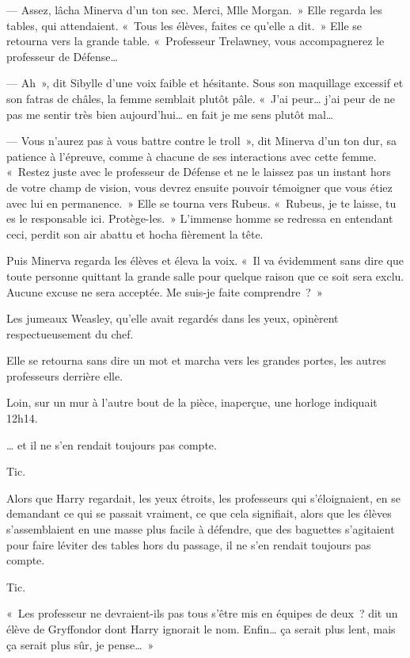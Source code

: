 --- Assez, lâcha Minerva d'un ton sec.
Merci, Mlle Morgan.~»
Elle regarda les tables, qui attendaient.
«~Tous les élèves, faites ce qu'elle a dit.~»
Elle se retourna vers la grande table.
«~Professeur Trelawney, vous accompagnerez le professeur de Défense…

--- Ah~», dit Sibylle d'une voix faible et hésitante.
Sous son maquillage excessif et son fatras de châles, la femme semblait plutôt pâle.
«~J'ai peur… j'ai peur de ne pas me sentir très bien aujourd'hui… en fait je me sens plutôt mal…

--- Vous n'aurez pas à vous battre contre le troll~», dit Minerva d'un ton dur, sa patience à l'épreuve, comme à chacune de ses interactions avec cette femme.
«~Restez juste avec le professeur de Défense et ne le laissez pas un instant hors de votre champ de vision, vous devrez ensuite pouvoir témoigner que vous étiez avec lui en permanence.~»
Elle se tourna vers Rubeus.
«~Rubeus, je te laisse, tu es le responsable ici.
Protège-les.~»
L'immense homme se redressa en entendant ceci, perdit son air abattu et hocha fièrement la tête.

Puis Minerva regarda les élèves et éleva la voix.
«~Il va évidemment sans dire que toute personne quittant la grande salle pour quelque raison que ce soit sera exclu.
Aucune excuse ne sera acceptée.
Me suis-je faite comprendre~?~»

Les jumeaux Weasley, qu'elle avait regardés dans les yeux, opinèrent respectueusement du chef.

Elle se retourna sans dire un mot et marcha vers les grandes portes, les autres professeurs derrière elle.

Loin, sur un mur à l'autre bout de la pièce, inaperçue, une horloge indiquait 12h14.

… et il ne s'en rendait toujours pas compte.

Tic.

Alors que Harry regardait, les yeux étroits, les professeurs qui s'éloignaient, en se demandant ce qui se passait vraiment, ce que cela signifiait, alors que les élèves s'assemblaient en une masse plus facile à défendre, que des baguettes s'agitaient pour faire léviter des tables hors du passage, il ne s'en rendait toujours pas compte.

Tic.

«~Les professeur ne devraient-ils pas tous s'être mis en équipes de deux~? dit un élève de Gryffondor dont Harry ignorait le nom.
Enfin… ça serait plus lent, mais ça serait plus sûr, je pense…~»

